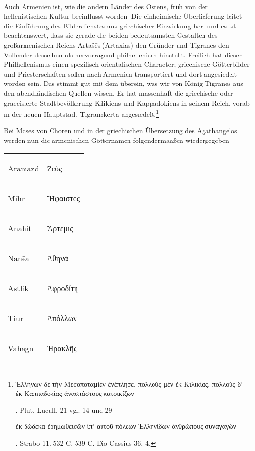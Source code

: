 \documentclass{article}
\begin{document}
\paragraph{}
Auch Armenien ist, wie die andern Länder des Ostens, früh von der hellenistischen Kultur beeinflusst worden. Die einheimische Überlieferung leitet die Einführung des Bilderdienstes aus griechischer Einwirkung her, und es ist beachtenswert, dass sie gerade die beiden bedeutsamsten Gestalten des großarmenischen Reichs Artašēs (Artaxias) den Gründer und Tigranes den Vollender desselben als hervorragend philhellenisch hinstellt. Freilich hat dieser Philhellenismus einen spezifisch orientalischen Character; griechische Götterbilder und Priesterschaften sollen nach Armenien transportiert und dort angesiedelt worden sein. Das stimmt gut mit dem überein, was wir von König Tigranes aus den abendländischen Quellen wissen. Er hat massenhaft die griechische oder graecisierte Stadtbevölkerung Kilikiens und Kappadokiens in seinem Reich, vorab in der neuen Hauptstadt Tigranokerta angesiedelt.\footnote{\begin{greek}Ἑλλήνων δὲ τὴν Μεσοποταμίαν ἐνέπλησε, πολλοὺς μὲν ἐκ Κιλικίας, πολλοὺς δ' ἐκ Καππαδοκίας ἀνασπάστους κατοικίζων\end{greek}. Plut. Lucull. 21 vgl. 14 und 29 \begin{greek}ἐκ δώδεκα ἐρημωθεισῶν ἱπ' αὐτοῦ πόλεων Ἑλληνίδων ἀνθρώπους συναγαγών\end{greek}. Strabo 11. 532 C. 539 C. Dio Cassius 36, 4.}

Bei Moses von Chorēn und in der griechischen Übersetzung des Agathangelos werden nun die armenischen Götternamen folgendermaaßen wiedergegeben:

\begin{table}[H]
    \centering
    \small
    \begin{tabular}{l l}
        Aramazd  &  \begin{greek}Ζεύς\end{greek}      \\
         Mihr     &  \begin{greek}Ἥφαιστος\end{greek}  \\
         Anahit   &  \begin{greek}Ἄρτεμις\end{greek}   \\
         Nanēa    &  \begin{greek}Ἀθηνᾶ\end{greek}     \\ 
         Astłik   &  \begin{greek}Ἀφροδίτη\end{greek}  \\
         Tiur     &  \begin{greek}Ἀπόλλων\end{greek}   \\
         Vahagn   &  \begin{greek}Ἡρακλῆς\end{greek} \\
    \end{tabular}
\end{table}
\end{document}
